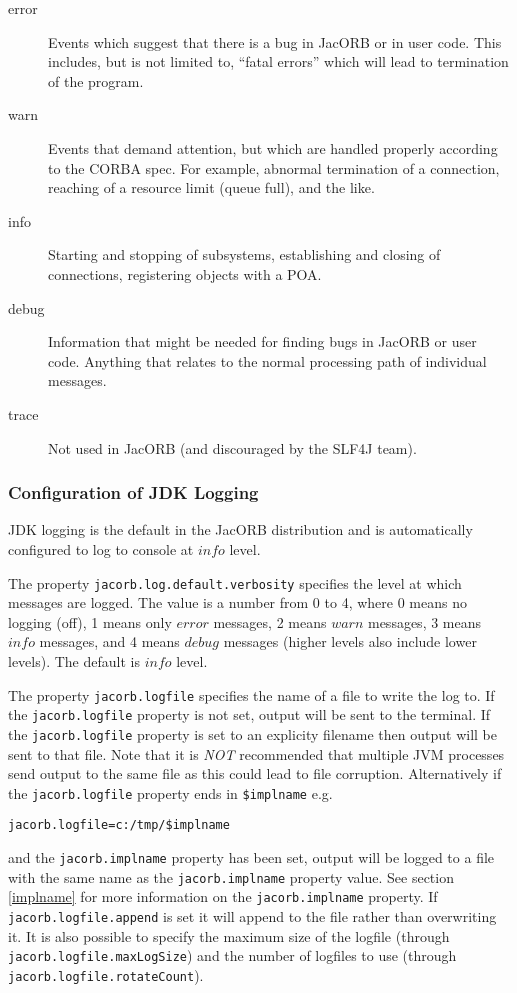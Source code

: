 \begin{description}
\item[error] Events which suggest that there is a bug in JacORB or in
  user code.  This includes, but is not limited to, ``fatal errors''
  which will lead to termination of the program.

\item[warn] Events that demand attention, but which are handled
  properly according to the CORBA spec.  For example, abnormal
  termination of a connection, reaching of a resource limit (queue
  full), and the like.

\item[info] Starting and stopping of subsystems, establishing and
  closing of connections, registering objects with a POA.

\item[debug] Information that might be needed for finding bugs in
  JacORB or user code.  Anything that relates to the normal processing
  path of individual messages.

\item[trace] Not used in JacORB (and discouraged by the SLF4J team).
\end{description}

\subsubsection{Configuration of JDK Logging}

JDK logging is the default in the JacORB distribution and is automatically
configured to log to console at $info$ level.

The property {\tt jacorb.log.default.verbosity} specifies the level at
which messages are logged.  The value is a number from 0 to 4, where 0
means no logging (off), 1 means only $error$ messages, 2 means $warn$
messages, 3 means $info$ messages, and 4 means $debug$ messages (higher
levels also include lower levels). The default is $info$ level.

The property {\tt jacorb.logfile} specifies the name of a file to
write the log to.  If the {\tt jacorb.logfile} property is not set, output
will be sent to the terminal.
If the {\tt jacorb.logfile} property is set to an explicity filename then
output will be sent to that file. Note that it is \emph{NOT} recommended that
multiple JVM processes send output to the same file as this could lead to file
corruption. Alternatively if the {\tt jacorb.logfile} property ends in
{\tt \$implname} e.g.
\small{
\begin{verbatim}
jacorb.logfile=c:/tmp/$implname
\end{verbatim}
}
\small\normalsize
and the {\tt jacorb.implname} property has been set, output will be logged
to a file with the same name as the {\tt jacorb.implname} property value. See
section \ref{implname} for more information on the {\tt jacorb.implname} property.
If {\tt jacorb.logfile.append} is set it will append to the file rather than overwriting
it. It is also possible to specify the maximum size of the logfile (through
{\tt jacorb.logfile.maxLogSize}) and the number of logfiles to use (through
{\tt jacorb.logfile.rotateCount}).

